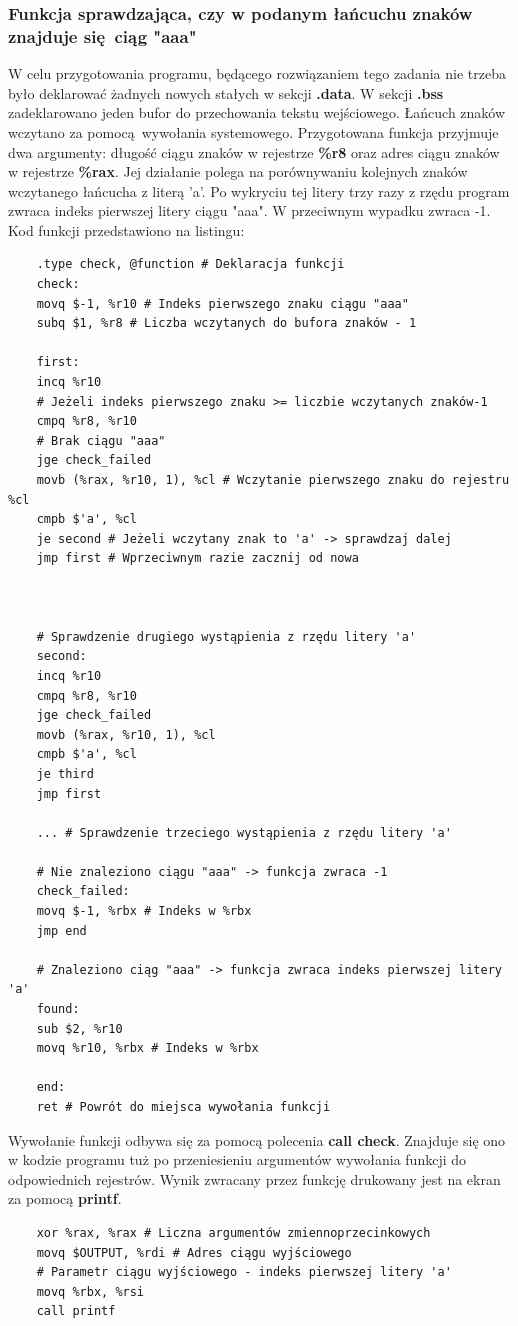 \documentclass[a4paper,12pt]{article}
\begin{document}
\subsubsection{Funkcja sprawdzająca, czy w podanym łańcuchu znaków znajduje się ciąg "aaa"}
W celu przygotowania programu, będącego rozwiązaniem tego zadania nie trzeba było deklarować żadnych nowych stałych w sekcji \textbf{.data}. W sekcji \textbf{.bss} zadeklarowano jeden bufor do przechowania tekstu wejściowego. Łańcuch znaków wczytano za pomocą wywołania systemowego. Przygotowana funkcja przyjmuje dwa argumenty: długość ciągu znaków w rejestrze \textbf{\%r8} oraz adres ciągu znaków w rejestrze \textbf{\%rax}. Jej działanie polega na porównywaniu kolejnych znaków wczytanego łańcucha z literą 'a'. Po wykryciu tej litery trzy razy z rzędu program zwraca indeks pierwszej litery ciągu "aaa". W przeciwnym wypadku zwraca -1. Kod funkcji przedstawiono na listingu:
\begin{verbatim}
	.type check, @function # Deklaracja funkcji
	check:
	movq $-1, %r10 # Indeks pierwszego znaku ciągu "aaa"
	subq $1, %r8 # Liczba wczytanych do bufora znaków - 1
	
	first:
	incq %r10
	# Jeżeli indeks pierwszego znaku >= liczbie wczytanych znaków-1
	cmpq %r8, %r10
	# Brak ciągu "aaa"
	jge check_failed
	movb (%rax, %r10, 1), %cl # Wczytanie pierwszego znaku do rejestru %cl
	cmpb $'a', %cl
	je second # Jeżeli wczytany znak to 'a' -> sprawdzaj dalej
	jmp first # Wprzeciwnym razie zacznij od nowa
	
	
	
	# Sprawdzenie drugiego wystąpienia z rzędu litery 'a'
	second:
	incq %r10
	cmpq %r8, %r10
	jge check_failed
	movb (%rax, %r10, 1), %cl 
	cmpb $'a', %cl
	je third
	jmp first
	
	... # Sprawdzenie trzeciego wystąpienia z rzędu litery 'a'
	
	# Nie znaleziono ciągu "aaa" -> funkcja zwraca -1
	check_failed:
	movq $-1, %rbx # Indeks w %rbx
	jmp end
	
	# Znaleziono ciąg "aaa" -> funkcja zwraca indeks pierwszej litery 'a'
	found:
	sub $2, %r10
	movq %r10, %rbx # Indeks w %rbx
	
	end:
	ret # Powrót do miejsca wywołania funkcji
\end{verbatim}
Wywołanie funkcji odbywa się za pomocą polecenia \textbf{call check}. Znajduje się ono w kodzie programu tuż po przeniesieniu argumentów wywołania funkcji do odpowiednich rejestrów. Wynik zwracany przez funkcję drukowany jest na ekran za pomocą \textbf{printf}.
\begin{verbatim}
	xor %rax, %rax # Liczna argumentów zmiennoprzecinkowych
	movq $OUTPUT, %rdi # Adres ciągu wyjściowego
	# Parametr ciągu wyjściowego - indeks pierwszej litery 'a'
	movq %rbx, %rsi 
	call printf
\end{verbatim}
\end{document}
